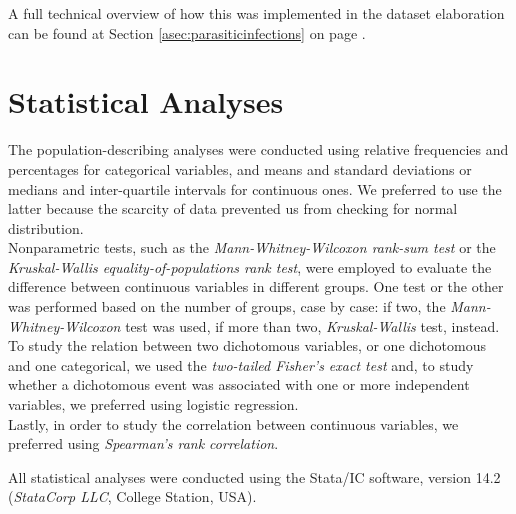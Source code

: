 A full technical overview of how this was implemented in the dataset elaboration can be found at Section \ref{asec:parasiticinfections} on page \pageref{asec:parasiticinfections}.

\section{Statistical Analyses}\label{sec:statisticalanalyses}
The population-describing analyses were conducted using relative frequencies and percentages for categorical variables, and means and standard deviations or medians and inter-quartile intervals for continuous ones. We preferred to use the latter because the scarcity of data prevented us from checking for normal distribution.\\
Nonparametric tests, such as the \textit{Mann-Whitney-Wilcoxon rank-sum test} or the \textit{Kruskal-Wallis equality-of-populations rank test}, were employed to evaluate the difference between continuous variables in different groups. One test or the other was performed based on the number of groups, case by case: if two, the \textit{Mann-Whitney-Wilcoxon} test was used, if more than two, \textit{Kruskal-Wallis} test, instead. To study the relation between two dichotomous variables, or one dichotomous and one categorical, we used the \textit{two-tailed Fisher's exact test} and, to study whether a dichotomous event was associated with one or more independent variables, we preferred using logistic regression.\\
Lastly, in order to study the correlation between continuous variables, we preferred using \textit{Spearman's rank correlation}.

All statistical analyses were conducted using the Stata/IC software, version 14.2 (\textit{StataCorp LLC}, College Station, USA).